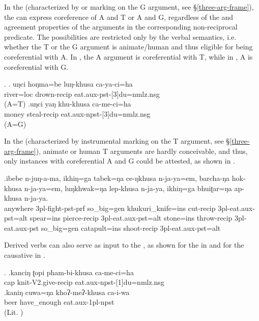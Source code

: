 In the  (characterized by  or  marking on the G argument, see §\ref{three-arg-frame}), the  can express coreference of A and T or A and G, regardless of the  and agreement properties of the arguments in the corresponding  non-reciprocal predicate. The possibilities are restricted only by the verbal semantics, i.e. whether the T or the G argument is animate/human and thus eligible for being coreferential with A.  In \Next[a], the A argument  is coreferential with T, while in \Next[b], A is coreferential with G.

\ex. \ag.	uŋci hoŋma=be luŋ-khusa ca-ya-ci=ha\\
		 river{\sc =loc} drown-{\sc recip}   eat{\sc .aux-pst-[3]du=nmlz.nsg}\\
	 (A=T)
 	\bg.uŋci yaŋ khu-khusa ca-me-ci=ha\\
	 money steal{\sc -recip} eat{\sc .aux-npst-[3]du=nmlz.nsg}\\
	 (A=G)
	
	
In the  (characterized by instrumental marking on the T argument, see §\ref{three-arg-frame}), animate or human T arguments are hardly conceivable, and thus, only instances with coreferential A and G could be attested, as shown in \Next.
	
	
\exg.ibebe n-juŋ-a-ma,   ikhiŋ=ga tabek=ŋa ce-ŋkhusa  n-ja-ya=em,  barcha-ŋa  hok-khusa  n-ja-ya=em, luŋkhwak=ŋa lep-khusa n-ja-ya, ikhiŋ=ga bhuiʈar=ŋa ap-khusa n-ja-ya.\\
	anywhere {\sc 3pl-}fight{\sc -pst-prf} so\_big{\sc =gen}  khukuri\_knife{\sc =ins} cut{\sc -recip} {\sc 3pl-}eat{\sc .aux-pst=alt} spear{\sc =ins} pierce{\sc -recip} {\sc 3pl-}eat{\sc .aux-pst=alt} stone{\sc =ins} throw{\sc -recip} {\sc 3pl-}eat{\sc .aux-pst} so\_big{\sc =gen} catapult{\sc =ins} shoot{\sc -recip} {\sc 3pl-}eat{\sc .aux-pst=alt}\\
	 
	

Derived verbs can also serve as input to the , as shown for the  in \Next[a] and for the causative in \Next[b].

	\ex. \ag.kanciŋ ʈopi pham-bi-khusa ca-me-ci=ha\\
	  cap knit{\sc -V2.give-recip} eat{\sc .aux-npst-[1]du=nmlz.nsg}		\\
	 \bg.kaniŋ cuwa=ŋa khoʔ-meʔ-khusa ca-i-wa\\
	 beer have\_enough eat{\sc .aux-1pl-npst}\\
	 (Lit. )



